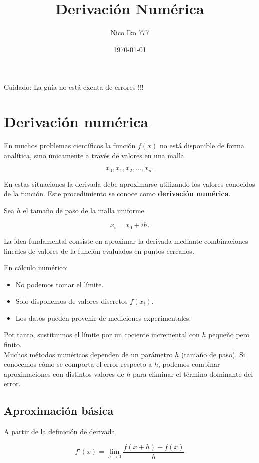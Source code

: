\documentclass[12pt,a4paper]{article}
\title{Derivación Numérica}
\author{Nico Iko 777}
\date{\today}
\theoremstyle{definition}
\theoremstyle{remark}
\begin{document}
\maketitle
\tableofcontents
\newpage

Cuidado: La guía no está exenta de errores !!!


\section{Derivación numérica}

En muchos problemas científicos la función $f(x)$ no está disponible de forma analítica,
sino únicamente a través de valores en una malla

\[
x_0, x_1, x_2, \dots , x_n .
\]

En estas situaciones la derivada debe aproximarse utilizando los valores conocidos
de la función. Este procedimiento se conoce como \textbf{derivación numérica}.

Sea $h$ el tamaño de paso de la malla uniforme

\[
x_i = x_0 + ih .
\]

La idea fundamental consiste en aproximar la derivada mediante combinaciones
lineales de valores de la función evaluados en puntos cercanos.


En cálculo numérico:
\begin{itemize}
\item No podemos tomar el límite.
\item Solo disponemos de valores discretos $f(x_i)$.
\item Los datos pueden provenir de mediciones experimentales.
\end{itemize}

Por tanto, sustituimos el límite por un cociente incremental con $h$ pequeño pero finito.\\

Muchos métodos numéricos dependen de un parámetro $h$ (tamaño de paso). 
Si conocemos cómo se comporta el error respecto a $h$, podemos combinar 
aproximaciones con distintos valores de $h$ para eliminar el término 
dominante del error.

\subsection{Aproximación básica}

A partir de la definición de derivada

\[
f'(x)=\lim_{h\to0}\frac{f(x+h)-f(x)}{h}
\]
\end{document}
